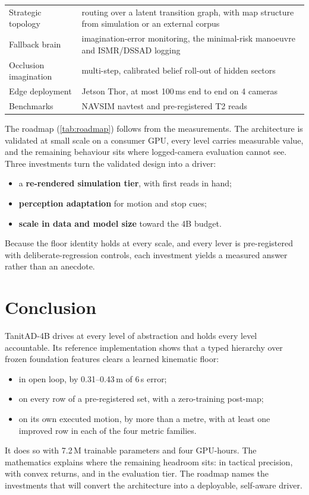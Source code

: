 \documentclass[10pt,twocolumn]{article}
\theoremstyle{remark}
\begin{document}
\begin{table}[t]
\begin{tabularx}{\columnwidth}{@{}>{\raggedright\arraybackslash}p{24mm}>{\raggedright\arraybackslash}X@{}}
Strategic topology & routing over a latent transition graph, with map structure from simulation or an external corpus \\
Fallback brain & imagination-error monitoring, the minimal-risk manoeuvre and ISMR/DSSAD logging \\
Occlusion imagination & multi-step, calibrated belief roll-out of hidden sectors \\
Edge deployment & Jetson Thor, at most 100\,ms end to end on 4 cameras \\
Benchmarks & NAVSIM navtest and pre-registered T2 reads \\
\bottomrule
\end{tabularx}
\end{table}

The roadmap (\cref{tab:roadmap}) follows from the measurements. The architecture is validated at small scale on a consumer GPU,
every level carries measurable value, and the remaining behaviour sits where logged-camera evaluation cannot see. Three investments
turn the validated design into a driver:
\begin{itemize}
  \item a \textbf{re-rendered simulation tier}, with first reads in hand;
  \item \textbf{perception adaptation} for motion and stop cues;
  \item \textbf{scale in data and model size} toward the 4B budget.
\end{itemize}
Because the floor identity holds at every scale, and every lever is pre-registered with deliberate-regression controls, each
investment yields a measured answer rather than an anecdote.

\section{Conclusion}
TanitAD-4B drives at every level of abstraction and holds every level accountable. Its reference implementation shows that a typed
hierarchy over frozen foundation features clears a learned kinematic floor:
\begin{itemize}
  \item in open loop, by 0.31--0.43\,m of 6\,s error;
  \item on every row of a pre-registered set, with a zero-training post-map;
  \item on its own executed motion, by more than a metre, with at least one improved row in each of the four metric families.
\end{itemize}
It does so with 7.2\,M trainable parameters and four GPU-hours. The mathematics explains where the remaining headroom sits: in
tactical precision, with convex returns, and in the evaluation tier. The roadmap names the investments that will convert the
architecture into a deployable, self-aware driver.
\end{document}
